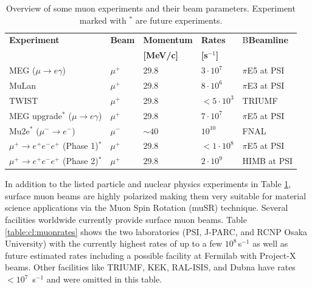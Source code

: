 \begin{table}[ht]
\begin{center}
\caption{Overview of some muon experiments and their beam parameters. Experiment marked with $^*$ are future experiments.\label{table:cl:muonexperiments}}
{ \begin{tabular}{lllll}\\
\hline
{\bf Experiment} & {\bf Beam} & {\bf Momentum} & {\bf Rates} & B{\bf Beamline}\\
{\bf } & {\bf } & {\bf [MeV/c]} & {\bf [s$^{-1}$]} & \\
\hline
MEG ($\mu\to e\gamma$) \cite{Adam:2013} & $\mu^+$ & 29.8 & $3 \cdot 10^7$ & $\pi$E5 at PSI\\
\hline
MuLan \cite{Tishchenko:2012ie} & $\mu^+$ & 29.8 & $8 \cdot 10^6$ & $\pi$E3 at PSI\\
\hline
TWIST \cite{Hillairet:2012} & $\mu^+$ & 29.8 & $<5 \cdot 10^3$ & TRIUMF\\
\hline
MEG upgrade$^*$ ($\mu\to e\gamma$) \cite{Baldini:2013ke} & $\mu^+$ & 29.8 & $7 \cdot 10^7$ & $\pi$E5 at PSI\\
\hline
Mu2e$^*$ ($\mu^- \to e^-$) \cite{Abrams:2012er} & $\mu^-$ & $\sim 40$ & $10^{10}$ & FNAL\\
\hline
$\mu^+ \to e^+e^-e^+$ (Phase 1)$^*$ \cite{Blondel:2013ia} & $\mu^+$ & $29.8$ & $<1 \cdot 10^8$ & $\pi$E5 at PSI\\
\hline
$\mu^+ \to e^+e^-e^+$ (Phase 2)$^*$ \cite{Blondel:2013ia} & $\mu^+$ & $29.8$ & $2 \cdot 10^9$ & HIMB at PSI\\
\hline
\end{tabular}}
\end{center}
\end{table}

In addition to the listed particle and nuclear physics experiments in Table \ref{table:cl:muonexperiments}, surface muon beams are highly polarized making them very suitable for material science applications via the Muon Spin Rotation (muSR) technique. Several facilities worldwide currently provide surface muon beams. Table \ref{table:cl:muonrates} shows the two laboratories (PSI, J-PARC, and RCNP Osaka University) with the currently highest rates of up to a few $10^8$\,s$^{-1}$ as well as future estimated rates including a possible facility at Fermilab with Project-X beams. Other facilities like TRIUMF, KEK, RAL-ISIS, and Dubna have rates $< 10^7$ \,s$^{-1}$ and were omitted in this table.

